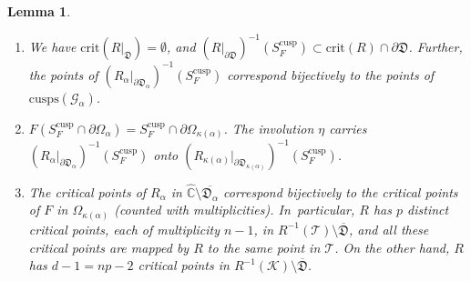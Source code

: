 \documentclass[JEP,XML,SOM,Unicode,NoFloatCountersInSection,published]{cedram}
\newtheorem{lemma}{Lemma}[section]
\theoremstyle{definition}
\theoremstyle{remark}
\newcommand{\C}{\mathbb{C}}
\newcommand{\cT}{\mathcal{T}}
\newcommand{\cK}{\mathcal{K}}
\begin{document}
\skpt
\begin{lemma}\label{crit_pnt_r_lem}
\begin{enumerate}
\item\label{crit_pnt_r_lem1} We have $\mathrm{crit}(R\vert_{\mathfrak{D}})=\emptyset$, and $(R\vert_{\partial\mathfrak{D}})^{-1}(S_F^{\mathrm{cusp}})\subset \mathrm{crit}(R)\cap \partial\mathfrak{D}$. Further, the points of $(R_\alpha\vert_{\partial\mathfrak{D}_\alpha})^{-1}(S_F^{\mathrm{cusp}})$ correspond bijectively to the points of $\mathrm{cusps}(\mathcal{G}_\alpha)$.

\item\label{crit_pnt_r_lem2} $F(S_F^{\mathrm{cusp}}\cap\partial\Omega_\alpha)=S_F^{\mathrm{cusp}}\cap\partial\Omega_{\kappa(\alpha)}$. The involution $\eta$ carries $(R_\alpha\vert_{\partial\mathfrak{D}_\alpha})^{-1}(S_F^{\mathrm{cusp}})$ onto $(R_{\kappa(\alpha)}\vert_{\partial\mathfrak{D}_{\kappa(\alpha)}})^{-1}(S_F^{\mathrm{cusp}})$.

\item\label{crit_pnt_r_lem3} The critical points of $R_\alpha$ in $\widehat{\C}\setminus\overline{\mathfrak{D}_\alpha}$ correspond bijectively to the critical points of $F$ in $\Omega_{\kappa(\alpha)}$ (counted with multiplicities). In~particular, $R$ has $p$ distinct critical points, each of multiplicity $n-1$, in $R^{-1}(\cT)\setminus\overline{\mathfrak{D}}$, and all these critical points are mapped by $R$ to the same point in $\cT$. On the other hand, $R$ has $d-1=np-2$ critical points in $R^{-1}(\cK)\setminus\overline{\mathfrak{D}}$.
\end{enumerate}
\end{lemma}
\end{document}
